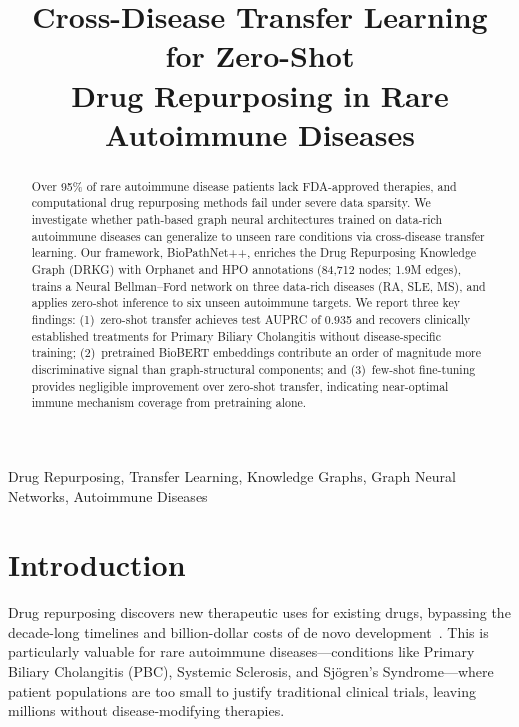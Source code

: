 \documentclass[conference]{IEEEtran}
\title{Cross-Disease Transfer Learning for Zero-Shot\\Drug Repurposing in Rare Autoimmune Diseases}
\author{
\IEEEauthorblockN{TVNS Yatin, A Charan KR, Praveen Kumar Yadav, Srijan Jha}
\IEEEauthorblockA{PES University, Bengaluru, India}
\IEEEauthorblockA{Under the guidance of Dr.\ Priyanka H.}
}
\begin{document}
\maketitle

\begin{abstract}
Over 95\% of rare autoimmune disease patients lack FDA-approved therapies, and computational drug repurposing methods fail under severe data sparsity. We investigate whether path-based graph neural architectures trained on data-rich autoimmune diseases can generalize to unseen rare conditions via cross-disease transfer learning. Our framework, BioPathNet++, enriches the Drug Repurposing Knowledge Graph (DRKG) with Orphanet and HPO annotations (84,712 nodes; 1.9M edges), trains a Neural Bellman--Ford network on three data-rich diseases (RA, SLE, MS), and applies zero-shot inference to six unseen autoimmune targets. We report three key findings: (1)~zero-shot transfer achieves test AUPRC of 0.935 and recovers clinically established treatments for Primary Biliary Cholangitis without disease-specific training; (2)~pretrained BioBERT embeddings contribute an order of magnitude more discriminative signal than graph-structural components; and (3)~few-shot fine-tuning provides negligible improvement over zero-shot transfer, indicating near-optimal immune mechanism coverage from pretraining alone.
\end{abstract}

\begin{IEEEkeywords}
Drug Repurposing, Transfer Learning, Knowledge Graphs, Graph Neural Networks, Autoimmune Diseases
\end{IEEEkeywords}

\section{Introduction}

Drug repurposing discovers new therapeutic uses for existing drugs, bypassing the decade-long timelines and billion-dollar costs of de novo development~\cite{drkg}. This is particularly valuable for rare autoimmune diseases---conditions like Primary Biliary Cholangitis (PBC), Systemic Sclerosis, and Sj\"{o}gren's Syndrome---where patient populations are too small to justify traditional clinical trials, leaving millions without disease-modifying therapies.
\end{document}
